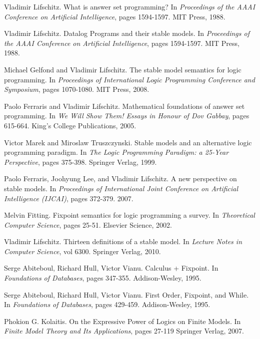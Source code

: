 \documentclass[11pt]{article}
\begin{document}
\begin{thebibliography}{9}
  Vladimir Lifschitz. 
  What is answer set programming? 
  In \textit{Proceedings of the AAAI Conference on Artificial Intelligence}, pages 1594-1597. 
  MIT Press, 1988.

  Vladimir Lifschitz. 
  Datalog Programs and their stable models.
  In \textit{Proceedings of the AAAI Conference on Artificial Intelligence}, pages 1594-1597. 
  MIT Press, 1988.

  Michael Gelfond and Vladimir Lifschitz. 
  The stable model semantics for logic programming.  
  In \textit{Proceedings of International Logic Programming Conference and Symposium}, pages 1070-1080. 
  MIT Press, 2008.

  Paolo Ferraris and Vladimir Lifschitz. 
  Mathematical foundations of answer set programming.  
  In \textit{We Will Show Them! Essays in Honour of Dov Gabbay}, pages 615-664. 
  King's College Publications, 2005.

  Victor Marek and Miroslaw Truszczynski. 
  Stable models and an alternative logic programming paradigm.  
  In \textit{The Logic Programming Paradigm: a 25-Year Perspective}, pages 375-398. 
  Springer Verlag, 1999.

  Paolo Ferraris, Joohyung Lee, and Vladimir Lifschitz. 
  A new perspective on stable models.  
  In \textit{Proceedings of International Joint Conference on Artificial Intelligence (IJCAI)}, pages 372-379. 
  2007.

  Melvin Fitting. 
  Fixpoint semantics for logic programming a survey. 
  In \textit{Theoretical Computer Science}, pages 25-51. Elsevier Science, 2002.

  Vladimir Lifschitz. 
  Thirteen definitions of a stable model.  
  In \textit{Lecture Notes in Computer Science}, vol 6300. 
  Springer Verlag, 2010.

  Serge Abiteboul, Richard Hull, Victor Vianu.
  Calculus + Fixpoint.
  In \textit{Foundations of Databases}, pages 347-355.
  Addison-Wesley, 1995.
  
  Serge Abiteboul, Richard Hull, Victor Vianu.
  First Order, Fixpoint, and While.
  In \textit{Foundations of Databases}, pages 429-459.
  Addison-Wesley, 1995.

  Phokion G. Kolaitis.
  On the Expressive Power of Logics on Finite Models.
  In \textit{Finite Model Theory and Its Applications}, pages 27-119
  Springer Verlag, 2007.


\end{thebibliography}
\end{document}
